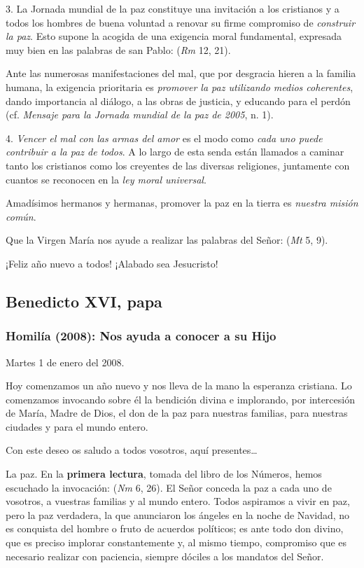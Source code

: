 \begin{body}
\begin{body}
3. La Jornada mundial de la paz constituye una invitación a los cristianos y a todos los hombres de buena voluntad a renovar su firme compromiso de \emph{construir la paz}. Esto supone la acogida de una exigencia moral fundamental, expresada muy bien en las palabras de san Pablo:  (\emph{Rm} 12, 21).

Ante las numerosas manifestaciones del mal, que por desgracia hieren a la familia humana, la exigencia prioritaria es \emph{promover la paz utilizando medios coherentes}, dando importancia al diálogo, a las obras de justicia, y educando para el perdón (cf. \emph{Mensaje para la Jornada mundial de la paz de 2005}, n. 1).

4. \emph{Vencer el mal con las armas del amor} es el modo como \emph{cada uno puede contribuir a la paz de todos}. A lo largo de esta senda están llamados a caminar tanto los cristianos como los creyentes de las diversas religiones, juntamente con cuantos se reconocen en la \emph{ley moral universal}.

Amadísimos hermanos y hermanas, promover la paz en la tierra es \emph{nuestra misión común}.

Que la Virgen María nos ayude a realizar las palabras del Señor:  (\emph{Mt} 5, 9).

¡Feliz año nuevo a todos! ¡Alabado sea Jesucristo!

\subsection{Benedicto XVI, papa}

\subsubsection{Homilía (2008): Nos ayuda a conocer a su Hijo}

Martes 1 de enero del 2008.

Hoy comenzamos un año nuevo y nos lleva de la mano la esperanza cristiana. Lo comenzamos invocando sobre él la bendición divina e implorando, por intercesión de María, Madre de Dios, el don de la paz para nuestras familias, para nuestras ciudades y para el mundo entero.

Con este deseo os saludo a todos vosotros, aquí presentes\ldots{}

La paz. En la \textbf{primera lectura}, tomada del libro de los Números, hemos escuchado la invocación:  (\emph{Nm} 6, 26). El Señor conceda la paz a cada uno de vosotros, a vuestras familias y al mundo entero. Todos aspiramos a vivir en paz, pero la paz verdadera, la que anunciaron los ángeles en la noche de Navidad, no es conquista del hombre o fruto de acuerdos políticos; es ante todo don divino, que es preciso implorar constantemente y, al mismo tiempo, compromiso que es necesario realizar con paciencia, siempre dóciles a los mandatos del Señor.


\end{body}
\end{body}
